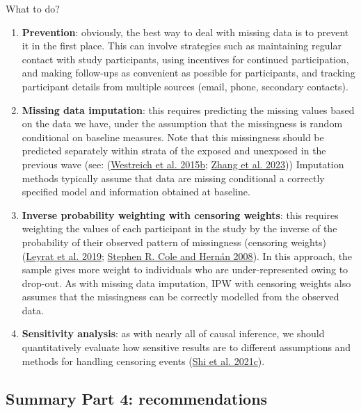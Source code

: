 \documentclass[
  singlecolumn]{report}
\begin{document}
What to do?

\begin{enumerate}
\def\labelenumi{\arabic{enumi}.}
\item
  \textbf{Prevention}: obviously, the best way to deal with missing data
  is to prevent it in the first place. This can involve strategies such
  as maintaining regular contact with study participants, using
  incentives for continued participation, and making follow-ups as
  convenient as possible for participants, and tracking participant
  details from multiple sources (email, phone, secondary contacts).
\item
  \textbf{Missing data imputation}: this requires predicting the missing
  values based on the data we have, under the assumption that the
  missingness is random conditional on baseline measures. Note that this
  missingness should be predicted separately within strata of the
  exposed and unexposed in the previous wave (see:
  (\protect\hyperlink{ref-westreich2015a}{Westreich et al. 2015b};
  \protect\hyperlink{ref-zhang2023}{Zhang et al. 2023})) Imputation
  methods typically assume that data are missing conditional a correctly
  specified model and information obtained at baseline.
\item
  \textbf{Inverse probability weighting with censoring weights}: this
  requires weighting the values of each participant in the study by the
  inverse of the probability of their observed pattern of missingness
  (censoring weights)(\protect\hyperlink{ref-leyrat2019}{Leyrat et al.
  2019}; \protect\hyperlink{ref-cole2008}{Stephen R. Cole and Hernán
  2008}). In this approach, the sample gives more weight to individuals
  who are under-represented owing to drop-out. As with missing data
  imputation, IPW with censoring weights also assumes that the
  missingness can be correctly modelled from the observed data.
\item
  \textbf{Sensitivity analysis}: as with nearly all of causal inference,
  we should quantitatively evaluate how sensitive results are to
  different assumptions and methods for handling censoring events
  (\protect\hyperlink{ref-shi2021a}{Shi et al. 2021c}).
\end{enumerate}

\hypertarget{summary-part-4-recommendations}{%
\subsection{Summary Part 4:
recommendations}\label{summary-part-4-recommendations}}
\end{document}
